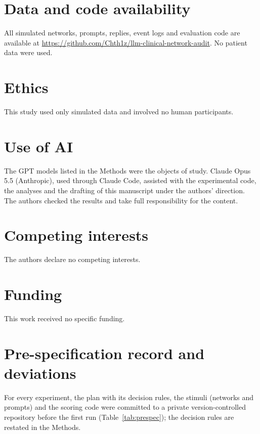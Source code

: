 \documentclass[11pt]{article}
\begin{document}
\section*{Data and code availability}
All simulated networks, prompts, replies, event logs and evaluation code are available at \url{https://github.com/Chth1z/llm-clinical-network-audit}. No patient data were used.

\section*{Ethics}
This study used only simulated data and involved no human participants.

\section*{Use of AI}
The GPT models listed in the Methods were the objects of study. Claude Opus 5.5 (Anthropic), used through Claude Code, assisted with the experimental code, the analyses and the drafting of this manuscript under the authors' direction. The authors checked the results and take full responsibility for the content.

\section*{Competing interests}
The authors declare no competing interests.

\section*{Funding}
This work received no specific funding.

\appendix

\section{Pre-specification record and deviations}
\label{app:prespec}

For every experiment, the plan with its decision rules, the stimuli (networks and prompts) and the scoring code were committed to a private version-controlled repository before the first run (Table~\ref{tab:prespec}); the decision rules are restated in the Methods.

\begin{table}[h]
\centering
\caption{Plan commits and the start of the first run of each experiment.}
\label{tab:prespec}
\resizebox{\textwidth}{!}{}
\end{table}
\end{document}
